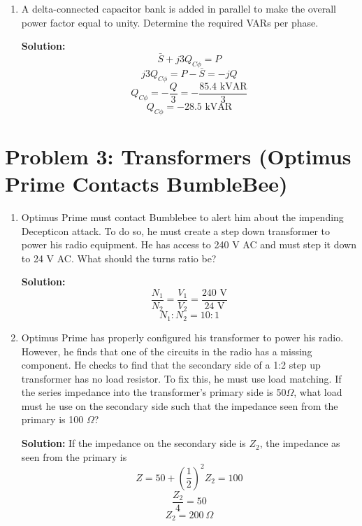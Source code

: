 \documentclass{article}
\begin{document}
\begin{enumerate}[label=(\alph*)]
    \item {A delta-connected capacitor bank is added in parallel to make the overall power factor equal to unity. Determine the required VARs per phase.}

\textbf{Solution:}
$$\bar{S} + j3Q_{C\phi} = P$$
$$j3Q_{C\phi} = P - \bar{S} = -jQ$$
$$Q_{C\phi} = -\frac{Q}{3} = -\frac{85.4\text{ kVAR}}{3}$$
$$\boxed{Q_{C\phi} = -28.5\text{ kVAR}}$$
\end{enumerate}

\newpage %
\noindent 
\section*{Problem 3: Transformers (Optimus Prime Contacts BumbleBee)}
\begin{enumerate}[label=(\alph*)]
    \item {Optimus Prime must contact Bumblebee to alert him about the impending Decepticon attack. To do so, he must create a step down transformer to power his radio equipment. He has access to 240 V AC and must step it down to 24 V AC. What should the turns ratio be?}

\textbf{Solution:} \\
$$\frac{N_1}{N_2} = \frac{V_1}{V_2} = \frac{240\text{ V}}{24\text{ V}}$$
$$\boxed{N_1:N_2 = 10:1}$$
    \item {Optimus Prime has properly configured his transformer to power his radio. However, he finds that one of the circuits in the radio has a missing component. He checks to find that the secondary side of a 1:2 step up transformer has no load resistor. To fix this, he must use load matching. If the series impedance into the transformer's primary side is 50$\Omega$, what load must he use on the secondary side such that the impedance seen from the primary is 100 $\Omega$?}

\textbf{Solution:}
If the impedance on the secondary side is $Z_2$, the impedance as seen from the primary is
$$Z = 50 + \left(\frac{1}{2}\right)^2Z_2 = 100$$
$$\frac{Z_2}{4} = 50$$
$$\boxed{Z_2 = 200\ \Omega}$$
\end{enumerate}
\newpage %
\noindent 
\end{document}
